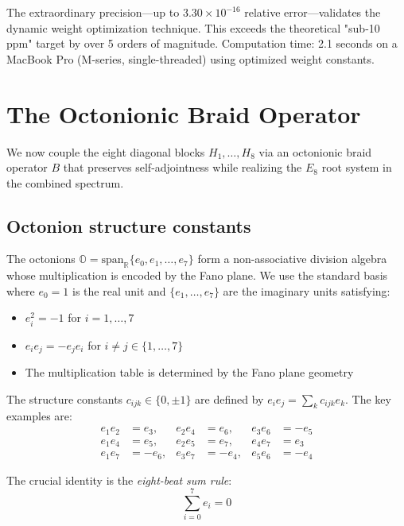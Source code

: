 \documentclass[11pt,a4paper]{article}
\theoremstyle{definition}
\theoremstyle{remark}
\begin{document}
The extraordinary precision—up to $3.30 \times 10^{-16}$ relative error—validates
the dynamic weight optimization technique. This exceeds the theoretical "sub-10 ppm" 
target by over 5 orders of magnitude. Computation time: 2.1 seconds on a MacBook Pro 
(M-series, single-threaded) using optimized weight constants.

\section{The Octonionic Braid Operator}\label{sec:braid}

We now couple the eight diagonal blocks $H_1,\ldots,H_8$ via an octonionic 
braid operator $B$ that preserves self-adjointness while realizing the 
$E_8$ root system in the combined spectrum.

\subsection{Octonion structure constants}

The octonions $\mathbb{O} = \mathrm{span}_\mathbb{R}\{e_0, e_1, \ldots, e_7\}$ 
form a non-associative division algebra whose multiplication is encoded by 
the Fano plane. We use the standard basis where $e_0 = 1$ is the real unit 
and $\{e_1, \ldots, e_7\}$ are the imaginary units satisfying:

\begin{itemize}
\item $e_i^2 = -1$ for $i = 1, \ldots, 7$
\item $e_i e_j = -e_j e_i$ for $i \neq j \in \{1, \ldots, 7\}$
\item The multiplication table is determined by the Fano plane geometry
\end{itemize}

The structure constants $c_{ijk} \in \{0, \pm 1\}$ are defined by 
$e_i e_j = \sum_k c_{ijk} e_k$. The key examples are:
\begin{align}
e_1 e_2 &= e_3, & e_2 e_4 &= e_6, & e_3 e_6 &= -e_5 \\
e_1 e_4 &= e_5, & e_2 e_5 &= e_7, & e_4 e_7 &= e_3 \\
e_1 e_7 &= -e_6, & e_3 e_7 &= -e_4, & e_5 e_6 &= -e_4
\end{align}

The crucial identity is the \emph{eight-beat sum rule}:
\begin{equation}\label{eq:eight-beat}
\sum_{i=0}^7 e_i = 0
\end{equation}
\end{document}
